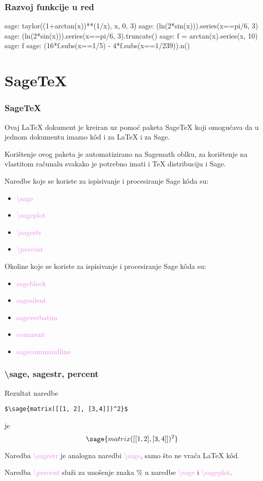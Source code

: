 \documentclass{beamer}
\begin{document}
\begin{frame}[fragile]\frametitle{Razvoj funkcije u red}
\begin{sagecommandline}
  sage: taylor((1+arctan(x))**(1/x), x, 0, 3)
  sage: (ln(2*sin(x))).series(x==pi/6, 3)
  sage: (ln(2*sin(x))).series(x==pi/6, 3).truncate()
  sage: f = arctan(x).series(x, 10)
  sage: f
  sage: (16*f.subs(x==1/5) - 4*f.subs(x==1/239)).n()
\end{sagecommandline}   
\end{frame}

\section{Sage\TeX}

\begin{frame}\frametitle{Sage\TeX}
Ovaj \LaTeX{} dokument je kreiran uz pomoć paketa Sage\TeX{} koji omogućava da u jednom dokumentu imamo k\^od i za \LaTeX{} i za Sage.

Korištenje ovog paketa je automatizirano na Sagemath oblku, za korištenje na vlastitom računalu svakako je potrebno imati i \TeX{} distribuciju i Sage.

Naredbe koje se koriste za ispisivanje i procesiranje Sage k\^oda su:

\begin{itemize}
  \item \textcolor{violet}{\textbackslash sage}
  \item \textcolor{violet}{\textbackslash sageplot}
  \item \textcolor{violet}{\textbackslash sagestr}
  \item \textcolor{violet}{\textbackslash percent}
\end{itemize}

Okoline koje se koriste za ispisivanje i procesiranje Sage k\^oda su:
\begin{itemize}
  \item \textcolor{violet}{sageblock}
  \item \textcolor{violet}{sagesilent}
  \item \textcolor{violet}{sageverbatim}
  \item \textcolor{violet}{comment}
  \item \textcolor{violet}{sagecommandline}
\end{itemize}
\end{frame}

\begin{frame}[fragile]\frametitle{\textbackslash sage, sagestr, percent}
Rezultat naredbe
\begin{lstlisting}
$\sage{matrix([[1, 2], [3,4]])^2}$
\end{lstlisting}  
je
\[\sage{matrix([[1, 2], [3,4]])^2}\]

Naredba \textcolor{violet}{\textbackslash sagestr} je analogna naredbi \textcolor{violet}{\textbackslash sage}, samo što ne vraća \LaTeX{} k\^od.

Naredba \textcolor{violet}{\textbackslash percent} služi za unošenje znaka \% u naredbe \textcolor{violet}{\textbackslash sage} i \textcolor{violet}{\textbackslash sageplot}.
\end{frame}
\end{document}
